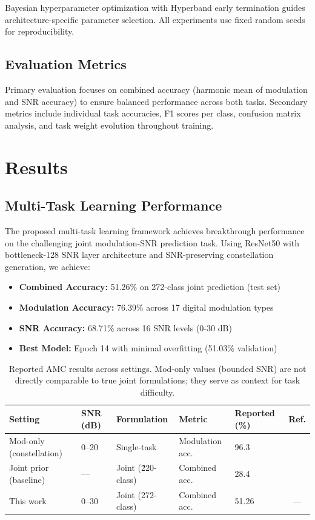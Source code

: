 \documentclass{ELSP}
\begin{document}
Bayesian hyperparameter optimization with Hyperband early termination guides architecture-specific parameter selection. All experiments use fixed random seeds for reproducibility.

\subsection{Evaluation Metrics}

Primary evaluation focuses on combined accuracy (harmonic mean of modulation and SNR accuracy) to ensure balanced performance across both tasks. Secondary metrics include individual task accuracies, F1 scores per class, confusion matrix analysis, and task weight evolution throughout training.

\section{Results}

\subsection{Multi-Task Learning Performance}

The proposed multi-task learning framework achieves breakthrough performance on the challenging joint modulation-SNR prediction task. Using ResNet50 with bottleneck-128 SNR layer architecture and SNR-preserving constellation generation, we achieve:

\begin{itemize}
    \item \textbf{Combined Accuracy:} 51.26\% on 272-class joint prediction (test set)
    \item \textbf{Modulation Accuracy:} 76.39\% across 17 digital modulation types  
    \item \textbf{SNR Accuracy:} 68.71\% across 16 SNR levels (0-30 dB)
    \item \textbf{Best Model:} Epoch 14 with minimal overfitting (51.03\% validation)
\end{itemize}

\begin{table}[t]
\centering
\small
\begin{tabular}{lllllc}
\toprule
Setting & SNR (dB) & Formulation & Metric & Reported (\%) & Ref. \\
\midrule
Mod-only (constellation) & 0--20 & Single-task & Modulation acc. & 96.3 & \cite{garcia2024ultralight} \\
Joint prior (baseline) & --- & Joint (\~220-class) & Combined acc. & 28.4 & \cite{liu2022jointsnr} \\
This work & 0--30 & Joint (272-class) & Combined acc. & 51.26 & --- \\
\bottomrule
\end{tabular}
\caption{Reported AMC results across settings. Mod-only values (bounded SNR) are not directly comparable to true joint formulations; they serve as context for task difficulty.}
\label{tab:sota}
\end{table}
\end{document}
